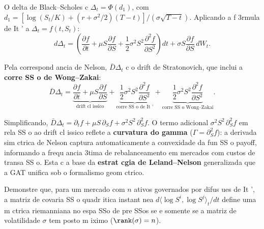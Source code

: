 \begin{sol}
O delta de Black--Scholes c $\Delta_t = \Phi(d_1)$, com $d_1 = [\log(S_t/K) + (r+\sigma^2/2)(T-t)]/(\sigma\sqrt{T-t})$. Aplicando a f 3rmula de It ' a $\Delta_t = f(t,S_t)$:
\begin{equation}
 d\Delta_t = \left(\frac{\partial f}{\partial t} + \mu S\frac{\partial f}{\partial S} + \frac{1}{2}\sigma^2 S^2\frac{\partial^2 f}{\partial S^2}\right)dt + \sigma S\frac{\partial f}{\partial S}\,dW_t.
\end{equation}

Pela correspond ancia de Nelson, $\bar{D}\Delta_t$ c o drift de Stratonovich, que inclui a \textbf{corre SS o de Wong--Zakai}:
\begin{equation}
 \bar{D}\Delta_t = \underbrace{\frac{\partial f}{\partial t} + \mu S\frac{\partial f}{\partial S}}_{\text{drift cl issico}} + \underbrace{\frac{1}{2}\sigma^2 S^2\frac{\partial^2 f}{\partial S^2}}_{\text{corre SS o de It '}} + \underbrace{\frac{1}{2}\sigma^2 S^2\frac{\partial^2 f}{\partial S^2}}_{\text{corre SS o Wong--Zakai}}.
\end{equation}

Simplificando, $\bar{D}\Delta_t = \partial_t f + \mu S\,\partial_S f + \sigma^2 S^2\,\partial_S^2 f$. O termo adicional $\sigma^2 S^2\,\partial_S^2 f$ em rela SS o ao drift cl issico reflete a \textbf{curvatura do gamma} ($\Gamma = \partial_S^2 f$): a derivada sim ctrica de Nelson captura automaticamente a convexidade da fun SS o payoff, informando a frequ ancia 3tima de rebalanceamento em mercados com custos de transa SS o. Esta c a base da \textbf{estrat cgia de Leland--Nelson} generalizada que a GAT unifica sob o formalismo geom ctrico.
\end{sol}

\begin{exer}
\label{ex:cov_metrica}
Demonstre que, para um mercado com $n$ ativos governados por difus ues de It ', a matriz de covaria SS o quadr itica instant nea $d\langle \log S^i, \log S^j\rangle_t/dt$ define uma m ctrica riemanniana no espa SSo de pre SSos se e somente se a matriz de volatilidade $\sigma$ tem posto m iximo ($\rank(\sigma)=n$).
\end{exer}

